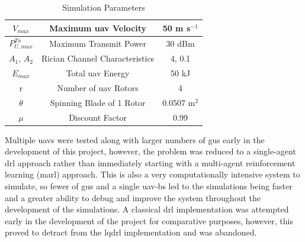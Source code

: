 \begin{table} [ht!]
\begin{tabular}{ | c | c | c | }
         \hline
         $V_{max}$ & Maximum \acrshort{uav} Velocity & 50 m s$^{-1}$ \\
         \hline
         $P_{U, max}^{Tx}$ & Maximum Transmit Power & 30 dBm \\
         \hline
         $A_{1}$, $A_{2}$ & Rician Channel Characteristics & 4, 0.1 \\
         \hline
         $E_{max}$ & Total \acrshort{uav} Energy & 50 kJ \\
         \hline
         r & Number of \acrshort{uav} Rotors & 4 \\
         \hline
         $\theta$ & Spinning Blade of 1 Rotor & 0.0507 m$^{2}$ \\
         \hline
         $\mu$ & Discount Factor & 0.99 \\
         \hline
    \end{tabular} 
    \caption{Simulation Parameters}
    \label{table:simulation_values}
\end{table}
Multiple \acrshort{uav}s were tested along with larger numbers of \acrshort{gu}s early in the development of this project, however, the problem was reduced to a single-agent \acrshort{drl} approach rather than immediately starting with a multi-agent reinforcement learning (\acrshort{marl}) approach. 
This is also a very computationally intensive system to simulate, so fewer of \acrshort{gu}s and a single \acrshort{uav}-\acrshort{bs} led to the simulations being faster and a greater ability to debug and improve the system throughout the development of the simulations. 
A classical \acrshort{drl} implementation was attempted early in the development of the project for comparative purposes, however, this proved to detract from the \acrshort{lqdrl} implementation and was abandoned. 